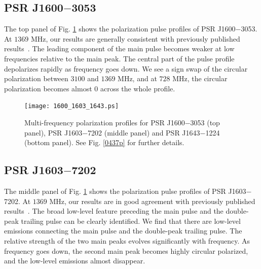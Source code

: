 \documentclass[useAMS,usenatbib]{mn2e}
\begin{document}
\subsection{PSR J1600$-$3053}

The top panel of Fig. \ref{1600p} shows the polarization pulse profiles of 
PSR J1600$-$3053.
%
At $1369$ MHz, our results are generally consistent with previously published
results~\citep{Ord04,Yan11}.
%
The leading component of the main pulse becomes weaker at low frequencies 
relative to the main peak.
%
The central part of the pulse profile depolarizes rapidly as frequency goes 
down. 
%
We see a sign swap of the circular polarization between $3100$ and 
$1369$ MHz, and at $728$ MHz, the circular polarization becomes almost 
$0$ across the whole profile.

%
%
%
%


\begin{figure}
\begin{center}
\texttt{[image: 1600\_1603\_1643.ps]}
\caption{Multi-frequency polarization profiles for PSR J1600$-$3053 (top 
panel), PSR J1603$-$7202 (middle panel) and PSR J1643$-$1224 (bottom panel). 
See Fig. \ref{0437p} for further details.}
\label{1600p}
\end{center}
\end{figure}

\subsection{PSR J1603$-$7202}

The middle panel of Fig. \ref{1600p} shows the polarization pulse profiles of 
PSR J1603$-$7202.
%
At $1369$ MHz, our results are in good agreement with previously published
results~\citep{Ord04,Yan11}.
%
The broad low-level feature preceding the main pulse and the double-peak trailing 
pulse can be clearly identified.
%
We find that there are low-level emissions connecting the main pulse and the 
double-peak trailing pulse.
%
The relative strength of the two main peaks evolves significantly with frequency.
%
As frequency goes down, the second main peak becomes highly circular polarized, 
and the low-level emissions almost disappear.
\end{document}

